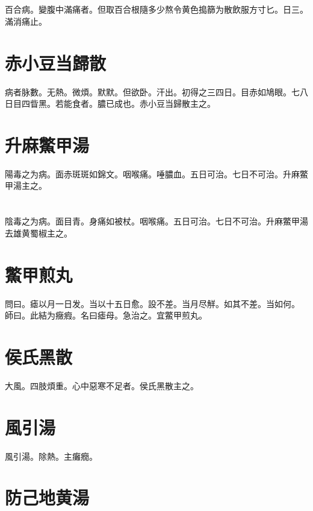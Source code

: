 \documentclass[12pt,twoside,UTF8,b5paper]{ctexbook}
\begin{document}
\section{}

百合病。變腹中滿痛者。但取百合根隨多少熬令黄色搗篩为散飲服方寸匕。日三。滿消痛止。

\section{赤小豆当歸散}

病者脉數。无熱。微煩。默默。但欲卧。汗出。初得之三四日。目赤如鳩眼。七八日目四眥黑。若能食者。膿已成也。赤{小}豆当歸散主之。

\section{升麻鱉甲湯}

陽毒之为病。面赤斑斑如錦文。咽喉痛。唾膿血。五日可治。七日不可治。升麻鱉甲湯主之。

\section{}

陰毒之为病。面目青。身痛如被杖。咽喉痛。五日可治。七日不可治。升麻鱉甲湯去雄黄蜀椒主之。

\section{鱉甲煎丸}

問曰。瘧以月一日发。当以十五日愈。設不差。当月尽觧。如其不差。当如何。\\
師曰。此結为癥瘕。名曰瘧母。急治之。宜鱉甲煎丸。

\section{侯氏黑散}

大風。四肢煩重。心中惡寒不足者。侯氏黑散主之。

\section{風引湯}

風引湯。除熱。主癱癇。

\section{防己地黄湯}
\end{document}
